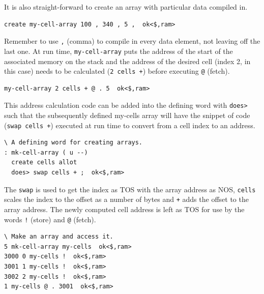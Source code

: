 \documentclass[12pt,a4paper]{article}
\begin{document}
\medskip
It is also straight-forward to create an array with particular data compiled in.
\begin{verbatim}
create my-cell-array 100 , 340 , 5 ,  ok<$,ram>
\end{verbatim}
Remember to use \verb!,! (comma) to compile in every data element, not leaving off the last one.
At run time, \verb!my-cell-array! puts the address of the start of the associated memory
on the stack and the address of the desired cell (index 2, in this case) 
needs to be calculated (\verb!2 cells +!) before executing \verb!@! (fetch).
\begin{verbatim}
my-cell-array 2 cells + @ . 5  ok<$,ram>
\end{verbatim}
This address calculation code can be added into the defining word with \verb!does>!
such that the subsequently defined my-cells array will have the snippet of code (\verb!swap cells +!)
executed at run time to convert from a cell index to an address.
\begin{verbatim}
\ A defining word for creating arrays.
: mk-cell-array ( u --) 
  create cells allot 
  does> swap cells + ;  ok<$,ram>
\end{verbatim}
The \verb!swap! is used to get the index as TOS with the array address as NOS,
\verb!cells! scales the index to the offset as a number of bytes and \verb!+! adds the
offset to the array address.
The newly computed cell address is left as TOS for use by the words \verb?!? (store) and \verb!@! (fetch). 
\begin{verbatim}
\ Make an array and access it.
5 mk-cell-array my-cells  ok<$,ram>
3000 0 my-cells !  ok<$,ram>
3001 1 my-cells !  ok<$,ram>
3002 2 my-cells !  ok<$,ram>
1 my-cells @ . 3001  ok<$,ram>
\end{verbatim}
\end{document}
